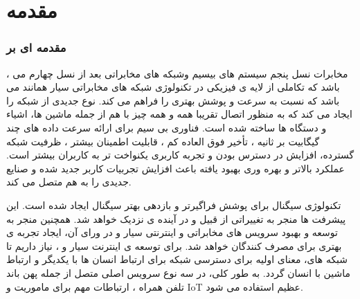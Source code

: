 \chapter{مقدمه}
\subsection{مقدمه ای بر  }
،
مخابرات نسل پنجم
سیستم های بیسیم  وشبکه های مخابراتی بعد از نسل چهارم می باشد که تکاملی از لایه ی فیزیکی در تکنولوژی شبکه های مخابراتی سیار همانند  می باشد که نسبت به  سرعت و پوشش بهتری را فراهم می کند.  
نوع جدیدی از شبکه را ایجاد می کند که به منظور اتصال تقریبا همه و همه چیز با هم از جمله ماشین ها، اشیاء و دستگاه ها ساخته شده است.
 فناوری بی سیم برای ارائه سرعت داده های چند گیگابیت بر ثانیه ، تأخیر فوق العاده کم ، قابلیت اطمینان بیشتر ، ظرفیت شبکه گسترده، افزایش در دسترس بودن و تجربه کاربری یکنواخت تر به کاربران بیشتر است. عملکرد بالاتر و بهره وری بهبود یافته باعث افزایش تجربیات کاربر جدید شده و صنایع جدیدی را به هم متصل می کند.
 
 
تکنولوژی سیگنال   برای پوشش فراگیرتر و بازدهی بهتر سیگنال ایجاد شده است. این پیشرفت ها منجر به تغییراتی از قبیل  و  در آینده ی نزدیک خواهد شد.
همچنین  منجر به توسعه و بهبود سرویس های مخابراتی و اینترنتی سیار و در ورای آن، ایجاد تجربه ی بهتری برای مصرف کنندگان خواهد شد.\newline
برای توسعه ی اینترنت سیار و ، نیاز داریم تا شبکه های، معنای اولیه برای دسترسی شبکه برای ارتباط انسان ها با یکدیگر و ارتباط ماشین با انسان گردد.
به طور کلی، 
 در سه نوع سرویس اصلی متصل از جمله پهن باند تلفن همراه ، ارتباطات مهم برای ماموریت و IoT عظیم استفاده می شود.
 
